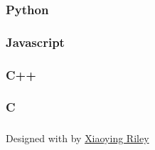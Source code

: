 \documentclass[english,]{article}
\begin{document}
\hypertarget{python}{%
\subsubsection{Python}\label{python}}

\hypertarget{javascript}{%
\subsubsection{Javascript}\label{javascript}}

\hypertarget{c}{%
\subsubsection{C++}\label{c}}

\hypertarget{c-1}{%
\subsubsection{C}\label{c-1}}

\hypertarget{section-5}{%
\subsubsection{}\label{section-5}}

\hypertarget{section-6}{%
\subsubsection{}\label{section-6}}

{Designed with \emph{} by \href{http://themes.3rdwavemedia.com}{Xiaoying
Riley}}
\end{document}
